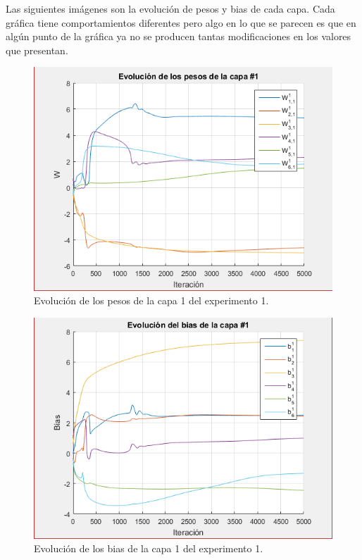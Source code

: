 Las siguientes imágenes son la evolución de pesos y bias de cada capa. Cada gráfica tiene comportamientos diferentes pero algo en lo que se parecen es que en algún punto de la gráfica ya no se producen tantas modificaciones en los valores que presentan.
\begin{figure}[H]
    \begin{center}
        \includegraphics[width=12cm]{1/pesos1.png}
        \caption{Evolución de los pesos de la capa 1 del experimento 1.}
        \label{fig:pesos1}
    \end{center}
\end{figure}

\begin{figure}[H]
    \begin{center}
        \includegraphics[width=12cm]{1/bias1.png}
        \caption{Evolución de los bias de la capa 1 del experimento 1.}
        \label{fig:bias1}
    \end{center}
\end{figure}

